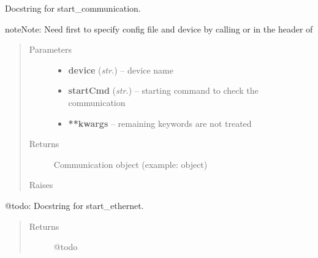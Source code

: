 \documentclass[letterpaper,10pt,english]{sphinxmanual}
\begin{document}
\begin{fulllineitems}
\begin{fulllineitems}
\end{fulllineitems}


\begin{fulllineitems}
\label{enuActor.Devices:enuActor.Devices.Device.OperationDevice.op_start_communication}
Docstring for start\_communication.

\begin{notice}{note}{Note:}
Need first to specify config file and device by calling 
or in the header of 
\end{notice}
\begin{quote}\begin{description}
\item[{Parameters}] \leavevmode\begin{itemize}
\item {} 
\textbf{device} (\emph{str.}) -- device name

\item {} 
\textbf{startCmd} (\emph{str.}) -- starting command to check the communication

\item {} 
\textbf{**kwargs} -- remaining keywords are not treated

\end{itemize}

\item[{Returns}] \leavevmode
Communication object (example:  object)

\item[{Raises}] \leavevmode
{\hyperref[enuActor.Devices:enuActor.Devices.Error.CfgFileErr]{}}

\end{description}\end{quote}

\end{fulllineitems}


\begin{fulllineitems}
\label{enuActor.Devices:enuActor.Devices.Device.OperationDevice.op_start_ethernet}
@todo: Docstring for start\_ethernet.
\begin{quote}\begin{description}
\item[{Returns}] \leavevmode
@todo


\end{description}
\end{quote}
\end{fulllineitems}
\end{fulllineitems}
\end{document}
